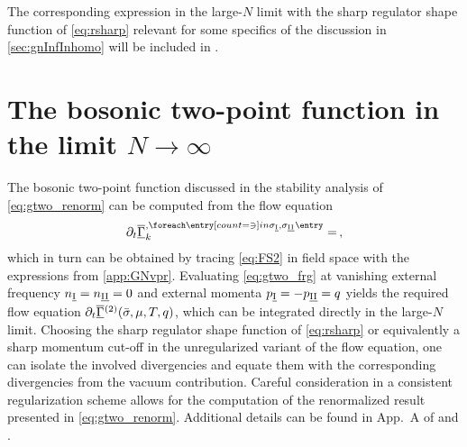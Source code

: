 The corresponding expression in the large-$N$ limit with the sharp regulator shape function of \cref{eq:rsharp} relevant for some specifics of the discussion in \cref{sec:gnInfInhomo} will be included in .

\section{The bosonic two-point function in the limit \texorpdfstring{$N\rightarrow\infty$}{ of infinite N}}\label{app:GNtwopt}
The bosonic two-point function discussed in the stability analysis of \cref{eq:gtwo_renorm} can be computed from the flow equation
\begin{align}
 \partial_t \FSvertexArg{\FSeaaEoM}{\sigma_{\iEI}, \sigma_{\iEII}} = \, ,
\label{eq:gtwo_frg}
\end{align}
which in turn can be obtained by tracing \cref{eq:FS2} in field space with the expressions from \cref{app:GNvpr}.
Evaluating \cref{eq:gtwo_frg} at vanishing external frequency $n_{\underline{\mathrm{I}}}=n_{\underline{\mathrm{II}}}=0$ and external momenta $p_{\underline{\mathrm{I}}}=-p_{\underline{\mathrm{II}}}=q$ yields the required flow equation
$\partial_t\overline{\underline{\Gamma}}\mkern0.5mu^{(2)}(\bar{\sigma},\mu,T,q)$, which can be integrated directly in the large-$N$ limit.
Choosing the sharp regulator shape function of \cref{eq:rsharp} or equivalently a sharp momentum cut-off in the unregularized variant of the flow equation, one can isolate the involved divergencies and equate them with the corresponding divergencies from the vacuum contribution. Careful consideration in a consistent regularization scheme allows for the computation of the renormalized result 
presented in \cref{eq:gtwo_renorm}. Additional details can be found in App.~A of  and .

\renewcommand{\FSk}{k}